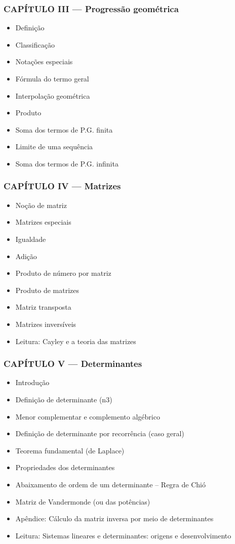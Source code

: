 \documentclass[a4paper,12pt]{article}[abntex2]
\begin{document}
\subsubsection*{CAPÍTULO III — Progressão geométrica}

\begin{itemize}
\item Definição
\item Classificação
\item Notações especiais
\item Fórmula do termo geral
\item Interpolação geométrica
\item Produto
\item Soma dos termos de P.G. finita
\item Limite de uma sequência
\item Soma dos termos de P.G. infinita
\end{itemize}
\subsubsection*{CAPÍTULO IV — Matrizes}

\begin{itemize}
\item Noção de matriz
\item Matrizes especiais
\item Igualdade
\item Adição
\item Produto de número por matriz
\item Produto de matrizes
\item Matriz transposta
\item Matrizes inversíveis
\item Leitura: Cayley e a teoria das matrizes
\end{itemize}
\subsubsection*{CAPÍTULO V — Determinantes}

\begin{itemize}
\item Introdução
\item Definição de determinante (n3)
\item Menor complementar e complemento algébrico
\item Definição de determinante por recorrência (caso geral)
\item Teorema fundamental (de Laplace)
\item Propriedades dos determinantes
\item Abaixamento de ordem de um determinante – Regra de Chió
\item Matriz de Vandermonde (ou das potências)
\item Apêndice: Cálculo da matriz inversa por meio de determinantes
\item Leitura: Sistemas lineares e determinantes: origens e desenvolvimento
\end{itemize}
\end{document}
